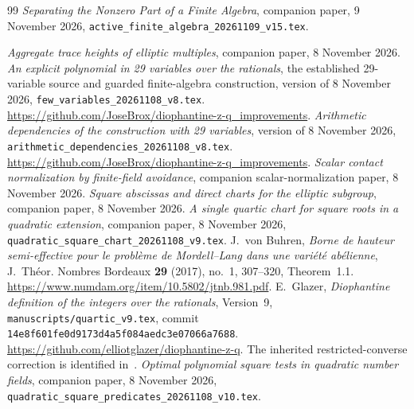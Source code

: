 \documentclass[11pt,a4paper]{article}
\begin{document}
\begin{thebibliography}{99}
\emph{Separating the Nonzero Part of a Finite Algebra},
companion paper, 9 November 2026,
\nolinkurl{active_finite_algebra_20261109_v15.tex}.

\emph{Aggregate trace heights of elliptic multiples},
companion paper, 8 November 2026.
\emph{An explicit polynomial in 29 variables over the rationals},
the established 29-variable source and guarded finite-algebra
construction, version of 8 November 2026,
\nolinkurl{few_variables_20261108_v8.tex}.
\url{https://github.com/JoseBrox/diophantine-z-q_improvements}.
\emph{Arithmetic dependencies of the construction with 29 variables},
version of 8 November 2026,
\nolinkurl{arithmetic_dependencies_20261108_v8.tex}.
\url{https://github.com/JoseBrox/diophantine-z-q_improvements}.
\emph{Scalar contact normalization by finite-field avoidance},
companion scalar-normalization paper, 8 November 2026.
\emph{Square abscissas and direct charts for the elliptic subgroup},
companion paper, 8 November 2026.
\emph{A single quartic chart for square roots in a quadratic extension},
companion paper, 8 November 2026,
\nolinkurl{quadratic_square_chart_20261108_v9.tex}.
J.~von Buhren,
\emph{Borne de hauteur semi-effective pour le probl\`eme de
Mordell--Lang dans une vari\'et\'e ab\'elienne},
J.~Th\'eor. Nombres Bordeaux \textbf{29} (2017), no.~1,
307--320, Theorem~1.1.
\url{https://www.numdam.org/item/10.5802/jtnb.981.pdf}.
E.~Glazer, \emph{Diophantine definition of the integers over the
rationals}, Version~9, \nolinkurl{manuscripts/quartic_v9.tex},
commit \nolinkurl{14e8f601fe0d9173d4a5f084aedc3e07066a7688}.
\url{https://github.com/elliotglazer/diophantine-z-q}.
The inherited restricted-converse correction is identified
in~\cite{Dependencies}.
\emph{Optimal polynomial square tests in quadratic number fields},
companion paper, 8 November 2026,
\nolinkurl{quadratic_square_predicates_20261108_v10.tex}.
\end{thebibliography}
\end{document}
